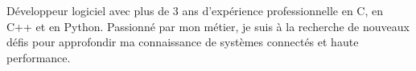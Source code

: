 \documentclass[9pt]{developercv2} %
\begin{document}

\begin{minipage}[t]{0.45\textwidth}
	\vspace{-\baselineskip}

\end{minipage}
\begin{minipage}[t]{0.55\textwidth}
	\begin{minipage}[t]{0.5\textwidth}
		\vspace{-\baselineskip}
		\\
		\\
		\\
	\end{minipage}
	\begin{minipage}[t]{0.5\textwidth}
		\vspace{-\baselineskip}
		\\
		\\
	\end{minipage}
\end{minipage}


Développeur logiciel avec plus de 3 ans d'expérience professionnelle en C, en C++ et en Python. Passionné par mon
métier, je suis à la recherche de nouveaux défis pour approfondir ma connaissance de systèmes connectés et haute
performance.
\end{document}
